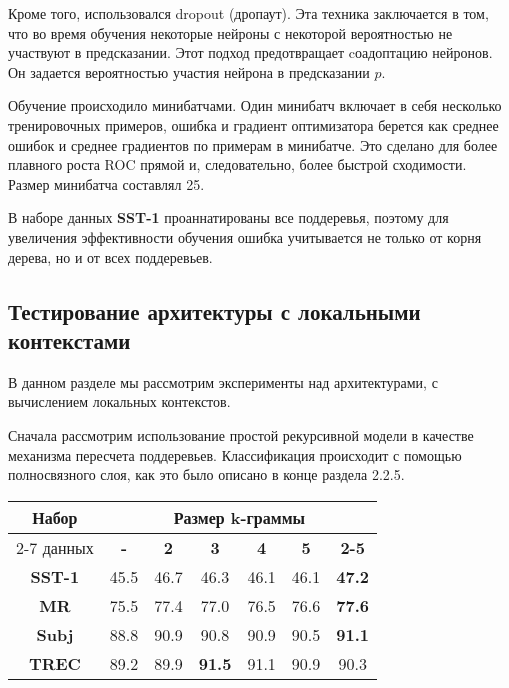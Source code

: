 Кроме того, использовался dropout (дропаут)\cite{DBLP:journals/corr/abs-1207-0580}. 
Эта техника заключается в том, что во время обучения некоторые нейроны с некоторой вероятностью не участвуют в предсказании.
Этот подход предотвращает cоадоптацию нейронов. Он задается вероятностью участия нейрона в предсказании $p$.

Обучение происходило минибатчами. Один минибатч включает в себя несколько тренировочных примеров, ошибка и градиент оптимизатора
берется как среднее ошибок и среднее градиентов по примерам в минибатче. Это сделано для более плавного роста ROC прямой и, следовательно, более быстрой сходимости. Размер минибатча составлял 25.

В наборе данных \textbf{SST-1} проаннатированы все поддеревья, 
поэтому для увеличения эффективности обучения ошибка учитывается не только от корня дерева, но и от всех поддеревьев.

\subsection{Тестирование архитектуры с локальными контекстами}
В данном разделе мы рассмотрим эксперименты над архитектурами, с вычислением локальных контекстов.

Сначала рассмотрим использование простой рекурсивной модели в качестве механизма пересчета поддеревьев.
Классификация происходит с помощью полносвязного слоя, как это было описано в конце раздела 2.2.5.

\vspace{5mm}
\begin{minipage}{\linewidth}
 \label{tab:title} 
\begin{tabular}{|c|c|c|c|c|c|c|}
\hline
\multirow{2}{*}{Набор} &                \multicolumn{6}{c|}{Размер k-граммы} \\ \cline{2-7} 
     данных            & \textbf{-} & \textbf{2} & \textbf{3} & \textbf{4} & \textbf{5} & \textbf{2-5} \\ \hline
\textbf{SST-1}         & 45.5     & 46.7     & 46.3     & 46.1     &  46.1    & \textbf{47.2} \\ \hline
\textbf{MR}            & 75.5     & 77.4     & 77.0     & 76.5     &  76.6    & \textbf{77.6}  \\ \hline
\textbf{Subj}          & 88.8     & 90.9     & 90.8     & 90.9     &  90.5    & \textbf{91.1} \\ \hline
\textbf{TREC}          & 89.2     & 89.9     & \textbf{91.5}       & 91.1     &  90.9    & 90.3 \\ \hline
\end{tabular}
\end{minipage}
\vspace{5mm}

